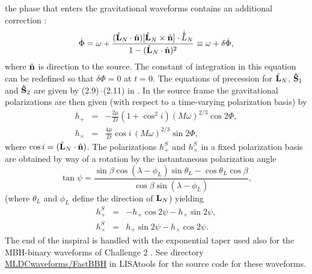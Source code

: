 \documentclass{iopart}
\def\bL{{\hat{\bf L}_{N}}}
\def\hn{{\hat{\bf n}}}
\begin{document}
the phase that enters the gravitational waveforms contains an additional correction \cite{ACST}:
%
\begin{equation}
\dot{\Phi} = \omega + \frac{(\bL\cdot\hn)[\bL\times \hn]\cdot\dot{\bf \hat{L}}_N}{1-(\bL\cdot\hn)^2}
\equiv \omega + \delta\dot{\Phi},\label{totPhi}
\end{equation}
%
where $\hn$ is direction to the source.
The constant of integration in this equation can be redefined so that $\delta\Phi = 0$ at $t=0$.  The equations of precession for $\bL$, ${\bf \hat{S}}_1$ and ${\bf \hat{S}}_2$ are given by (2.9)--(2.11) in 
 \cite{LangHughes}. In the source frame the gravitational polarizations are then given (with respect to a time-varying polarization basis) by
%
\begin{eqnarray}
h_{+} &=& -\frac{2\mu}{D}(1 + \cos^2 i)(M\omega)^{2/3}\cos{2\Phi}, \nonumber \\
h_{\times} &=& \frac{4\mu}{D}\cos i \,(M\omega)^{2/3}\sin{2\Phi},
\label{eq:polmbh}
\end{eqnarray}
%
where $\cos{i} = (\bL \cdot \hn)$.
The polarizations $h^S_+$ and $h^S_\times$ in a fixed polarization basis are obtained by way of a rotation by the instantaneous polarization angle
%
\begin{equation}
\tan{\psi} = \frac{\sin{\beta}\cos{(\lambda -\phi_L)}\sin{\theta_L} - \cos{\theta_L}\cos{\beta}}
{\cos{\beta}\sin{(\lambda - \phi_L)}},
\end{equation}
%
(where $\theta_L$ and $\phi_L$ define the direction of ${\bf L}_N$) yielding
%
\begin{eqnarray}
h_{+}^S &=& -h_{+}\cos{2\psi} - h_{\times}\sin{2\psi},\\
h_{\times}^S &=& h_{+}\sin{2\psi} - h_{\times}\cos{2\psi}.
\end{eqnarray}
%
The end of the inspiral is handled with the exponential taper used also for the MBH-binary waveforms of Challenge 2 \cite{mldcgwdaw2}.
See directory \url{MLDCwaveforms/FastBBH} in LISAtools for the source code for these waveforms.
\end{document}
